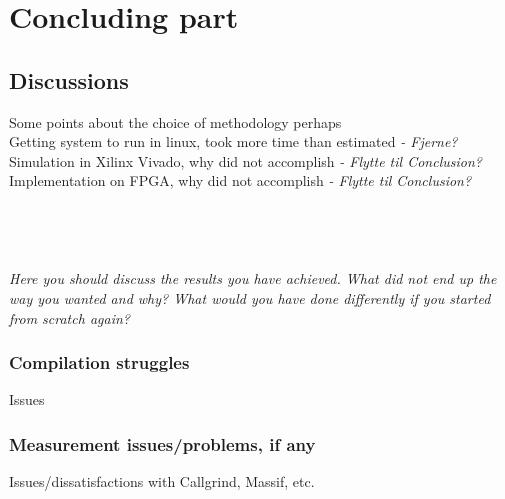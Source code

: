 \chapter{Concluding part}
\section{Discussions}
Some points about the choice of methodology perhaps\\
Getting system to run in linux, took more time than estimated \textit{\color{red} - Fjerne?}\\
Simulation in Xilinx Vivado, why did not accomplish \textit{\color{red}- Flytte til Conclusion?}\\
Implementation on FPGA, why did not accomplish \textit{\color{red}- Flytte til Conclusion?}\\\\
\cite{PacketBased, Packets}
\\\\
\noindent
\textit{\color{red}\\
Here you should discuss the results you have achieved. What did not end up the way you wanted and why? What would you have done differently if you started from scratch again? }\\


\subsection{Compilation struggles}
Issues\\


\subsection{Measurement issues/problems, if any}
Issues/dissatisfactions with Callgrind, Massif, etc. \\

\clearpage

